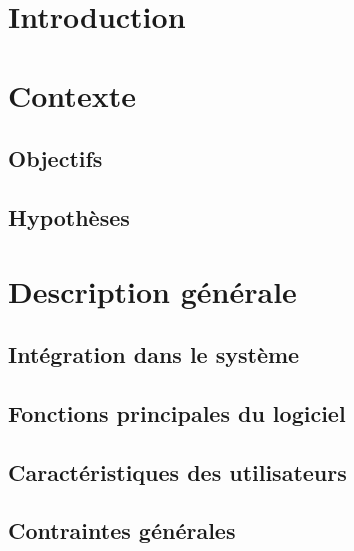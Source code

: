 \documentclass[asi]{picINSA}
\title{\DSE{}}
\author{\Pierre} %
\begin{document}
\couverture{}

 \informationsGenerales{}
%

\tableofcontents

\setcounter{chapter}{0}


\chapter*{Introduction}
\label{intro}


\chapter{Contexte}

\section{Objectifs}
\label{objectifs}


\section{Hypothèses}
\label{hypotheses}


\chapter{Description générale}

\section{Intégration dans le système}
\label{inte_sys}


\section{Fonctions principales du logiciel}
\label{fonct_princ}


\section{Caractéristiques des utilisateurs}
\label{caract_user}


\section{Contraintes générales}
\label{contraintes_gen}

\end{document}

